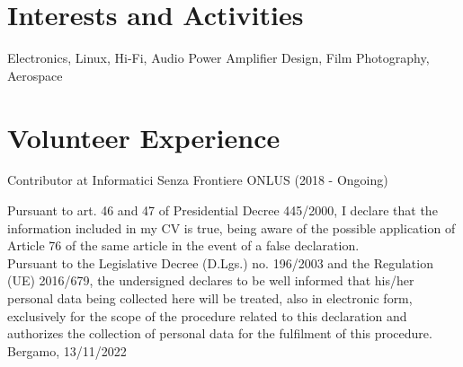 \documentclass[11pt]{article}
\begin{document}
\bigskip
\section*{Interests and Activities}
Electronics, Linux, Hi-Fi,  Audio Power Amplifier Design, Film Photography, Aerospace

\bigskip
\section*{Volunteer Experience}
Contributor at Informatici Senza Frontiere ONLUS (2018 - Ongoing)

\vspace{2cm}
\noindent
Pursuant to art. 46 and 47 of Presidential Decree 445/2000, I declare that the information included in my CV is true, being aware of the possible application of Article 76 of the same article in the event of a false declaration.\\
Pursuant to the Legislative Decree (D.Lgs.) no. 196/2003 and the Regulation (UE) 2016/679, the undersigned declares to be well informed that his/her personal data being collected here will be treated, also in electronic form, exclusively for the scope of the procedure related to this declaration and authorizes the collection of personal data for the fulfilment of this procedure.\\

\bigskip
Bergamo, 13/11/2022
\vspace{1cm}
\end{document}
